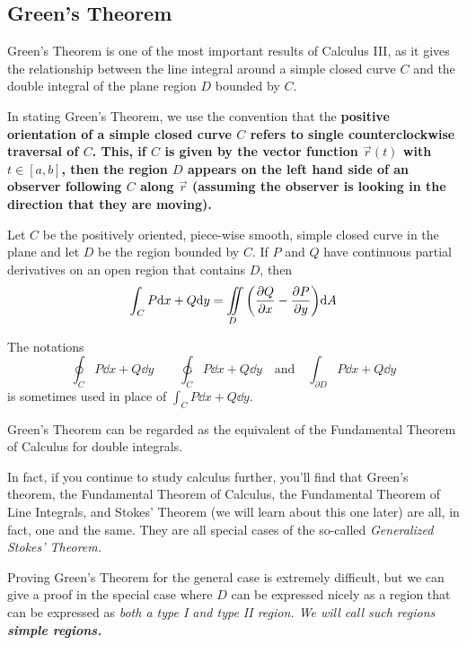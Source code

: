 \subsection{Green's Theorem}
Green's Theorem is one of the most important results of Calculus III, as it gives the relationship between the line integral around a simple closed curve $C$ and the double integral of the plane region $D$ bounded by $C$. \par
In stating Green's Theorem, we use the convention that the \bf{positive orientation} of a simple closed curve $C$ refers to single counterclockwise traversal of $C$. This, if $C$ is given by the vector function $\vec r(t)$ with $t\in[a,b]$, then the region $D$ appears on the left hand side of an observer following $C$ along $\vec r$ (assuming the observer is looking in the direction that they are moving). 
\begin{theorem}
    Let $C$ be the positively oriented, piece-wise smooth, simple closed curve in the plane and let $D$ be the region bounded by $C$. If $P$ and $Q$ have continuous partial derivatives on an open region that contains $D$, then
    \[ \int_C P\dd x + Q\dd y = \iint\limits_D \pqty{\pdv{Q}{x}-\pdv{P}{y}}\dd A\]
\end{theorem}
The notations
\[\oint_C P\dd x + Q\dd y \quad\quad \ointctrclockwise_C P\dd x + Q\dd y \quad\text{and}\quad \int_{\partial D}P\dd x + Q\dd y\]
is sometimes used in place of $\int_C P\dd x + Q\dd y$. \par
Green's Theorem can be regarded as the equivalent of the Fundamental Theorem of Calculus for double integrals. \par
In fact, if you continue to study calculus further, you'll find that Green's theorem, the Fundamental Theorem of Calculus, the Fundamental Theorem of Line Integrals, and Stokes' Theorem (we will learn about this one later) are all, in fact, one and the same. They are all special cases of the so-called \it{Generalized Stokes' Theorem}. \par
Proving Green's Theorem for the general case is extremely difficult, but we can give a proof in the special case where $D$ can be expressed nicely as a region that can be expressed as \it{both} a type I and type II region. We will call such regions \bf{simple regions}.
